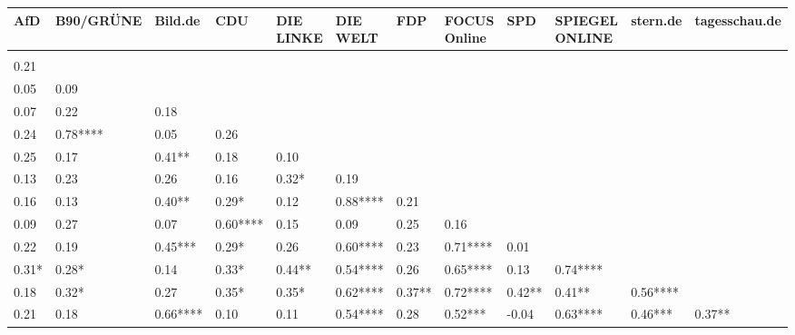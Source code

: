 \begin{table}[ht]
\centering
\begin{tabular}{llllllllllll}
  \hline
AfD & B90/GRÜNE & Bild.de & CDU & DIE LINKE & DIE WELT & FDP & FOCUS Online & SPD & SPIEGEL ONLINE & stern.de & tagesschau.de \\ 
  \hline
 &  &  &  &  &  &  &  &  &  &  &  \\ 
   0.21     &  &  &  &  &  &  &  &  &  &  &  \\ 
   0.05     &  0.09     &  &  &  &  &  &  &  &  &  &  \\ 
   0.07     &  0.22     &  0.18     &  &  &  &  &  &  &  &  &  \\ 
   0.24     &  0.78**** &  0.05     &  0.26     &  &  &  &  &  &  &  &  \\ 
   0.25     &  0.17     &  0.41**   &  0.18     &  0.10     &  &  &  &  &  &  &  \\ 
   0.13     &  0.23     &  0.26     &  0.16     &  0.32*    &  0.19     &  &  &  &  &  &  \\ 
   0.16     &  0.13     &  0.40**   &  0.29*    &  0.12     &  0.88**** &  0.21     &  &  &  &  &  \\ 
   0.09     &  0.27     &  0.07     &  0.60**** &  0.15     &  0.09     &  0.25     &  0.16     &  &  &  &  \\ 
   0.22     &  0.19     &  0.45***  &  0.29*    &  0.26     &  0.60**** &  0.23     &  0.71**** &  0.01     &  &  &  \\ 
   0.31*    &  0.28*    &  0.14     &  0.33*    &  0.44**   &  0.54**** &  0.26     &  0.65**** &  0.13     &  0.74**** &  &  \\ 
   0.18     &  0.32*    &  0.27     &  0.35*    &  0.35*    &  0.62**** &  0.37**   &  0.72**** &  0.42**   &  0.41**   &  0.56**** &  \\ 
   0.21     &  0.18     &  0.66**** &  0.10     &  0.11     &  0.54**** &  0.28     &  0.52***  & -0.04     &  0.63**** &  0.46***  &  0.37**   \\ 
   \hline
\end{tabular}
\end{table}
